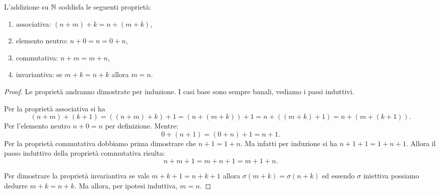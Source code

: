 \begin{theorem}\label{th:proprieta_addizione}
  L'addizione su ${\mathbb N}$ soddisfa le seguenti 
  proprietà:
  \begin{enumerate}
    \item associativa: $(n+m)+k = n + (m + k)$,
    \item elemento neutro: $n+0 = n = 0+n$,
    \item commutativa: $n+m = m+n$,
    \item invariantiva: se $m+k = n+k$ allora $m=n$.
  \end{enumerate}
\end{theorem}
\begin{proof}
Le proprietà andranno dimostrate per induzione.
I casi base sono sempre banali, vediamo i passi induttivi.

Per la proprietà associativa si ha
\[
(n+m)+(k+1) 
= ((n+m)+k)+1 
= (n+(m+k))+1
= n +((m+k)+1)
= n + (m + (k+1)).
\]
Per l'elemento neutro $n+0=n$ per definizione. Mentre:
\[
0+(n+1) = (0+n)+1 = n+1.
\]
Per la proprietà commutativa dobbiamo prima dimostrare che $n+1=1+n$.
Ma infatti per induzione si ha $n+1+1 = 1+n+1$.
Allora il passo induttivo della proprietà commutativa risulta:
\[
n + m + 1 
= m + n + 1
= m + 1 + n.
\]

Per dimostrare la proprietà invariantiva se vale $m+k+1=n+k+1$
allora $\sigma(m+k)=\sigma(n+k)$ ed essendo $\sigma$ iniettiva 
possiamo dedurre $m+k=n+k$. Ma allora, per ipotesi induttiva, $m=n$. 
\end{proof}




